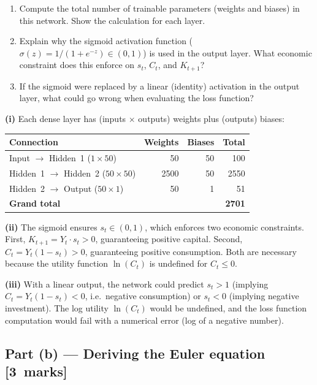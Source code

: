 \documentclass[11pt,a4paper]{article}
\newcommand{\mkpts}[1]{\hfill\textbf{[#1~marks]}}
\begin{document}
\begin{enumerate}[label=(\roman*),nosep]
\item Compute the total number of trainable parameters (weights and biases) in this network.  Show the calculation for each layer.
\item Explain why the sigmoid activation function ($\sigma(z) = 1/(1+e^{-z}) \in (0,1)$) is used in the output layer.  What economic constraint does this enforce on $s_t$, $C_t$, and $K_{t+1}$?
\item If the sigmoid were replaced by a linear (identity) activation in the output layer, what could go wrong when evaluating the loss function?
\end{enumerate}

\begin{solution}
\textbf{(i)} Each dense layer has (inputs $\times$ outputs) weights plus (outputs) biases:

\begin{tabular}{lrrr}
\toprule
Connection & Weights & Biases & Total \\
\midrule
Input $\to$ Hidden~1 ($1\times 50$) & 50 & 50 & 100 \\
Hidden~1 $\to$ Hidden~2 ($50\times 50$) & 2500 & 50 & 2550 \\
Hidden~2 $\to$ Output ($50\times 1$) & 50 & 1 & 51 \\
\midrule
\textbf{Grand total} & & & \textbf{2701} \\
\bottomrule
\end{tabular}

\medskip

\textbf{(ii)} The sigmoid ensures $s_t \in (0,1)$, which enforces two economic constraints.  First, $K_{t+1} = Y_t \cdot s_t > 0$, guaranteeing positive capital.  Second, $C_t = Y_t(1-s_t) > 0$, guaranteeing positive consumption.  Both are necessary because the utility function $\ln(C_t)$ is undefined for $C_t \le 0$.

\medskip

\textbf{(iii)} With a linear output, the network could predict $s_t > 1$ (implying $C_t = Y_t(1-s_t) < 0$, i.e.\ negative consumption) or $s_t < 0$ (implying negative investment).  The log utility $\ln(C_t)$ would be undefined, and the loss function computation would fail with a numerical error (log of a negative number).
\end{solution}

\subsection*{Part (b) --- Deriving the Euler equation \mkpts{3}}
\end{document}
